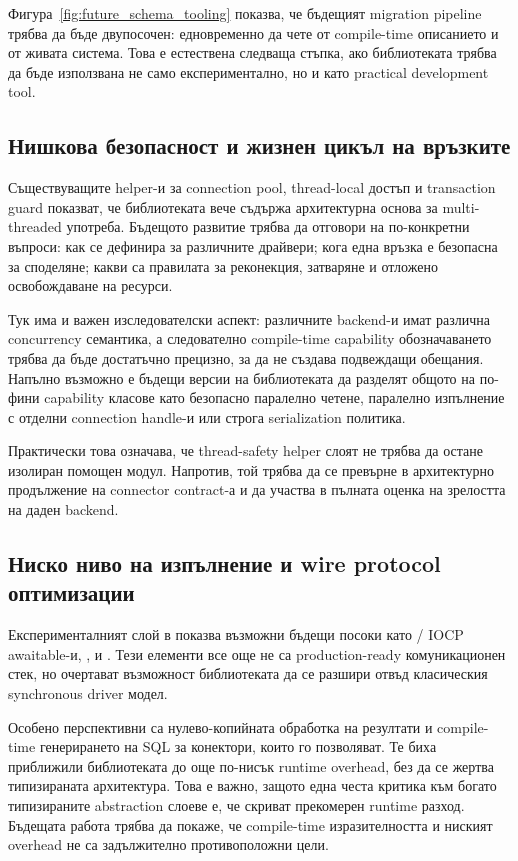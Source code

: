 Фигура~\ref{fig:future_schema_tooling} показва, че бъдещият migration pipeline трябва да бъде двупосочен: едновременно да чете от compile-time описанието и от живата система. Това е естествена следваща стъпка, ако библиотеката трябва да бъде използвана не само експериментално, но и като practical development tool.

\subsection{Нишкова безопасност и жизнен цикъл на връзките}

Съществуващите helper-и за connection pool, thread-local достъп и transaction guard показват, че библиотеката вече съдържа архитектурна основа за multi-threaded употреба. Бъдещото развитие трябва да отговори на по-конкретни въпроси: как се дефинира  за различните драйвери; кога една връзка е безопасна за споделяне; какви са правилата за реконекция, затваряне и отложено освобождаване на ресурси.

Тук има и важен изследователски аспект: различните backend-и имат различна concurrency семантика, а следователно compile-time capability обозначаването трябва да бъде достатъчно прецизно, за да не създава подвеждащи обещания. Напълно възможно е бъдещи версии на библиотеката да разделят общото  на по-фини capability класове като безопасно паралелно четене, паралелно изпълнение с отделни connection handle-и или строга serialization политика.

Практически това означава, че thread-safety helper слоят не трябва да остане изолиран помощен модул. Напротив, той трябва да се превърне в архитектурно продължение на connector contract-а и да участва в пълната оценка на зрелостта на даден backend.

\subsection{Ниско ниво на изпълнение и wire protocol оптимизации}

Експерименталният слой в  показва възможни бъдещи посоки като  / IOCP awaitable-и, ,  и . Тези елементи все още не са production-ready комуникационен стек, но очертават възможност библиотеката да се разшири отвъд класическия synchronous driver модел.

Особено перспективни са нулево-копийната обработка на резултати и compile-time генерирането на SQL за конектори, които го позволяват. Те биха приближили библиотеката до още по-нисък runtime overhead, без да се жертва типизираната архитектура. Това е важно, защото една честа критика към богато типизираните abstraction слоеве е, че скриват прекомерен runtime разход. Бъдещата работа трябва да покаже, че compile-time изразителността и ниският overhead не са задължително противоположни цели.

